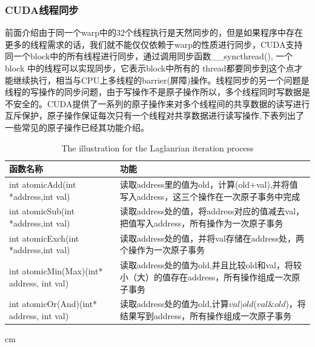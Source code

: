 \subsubsection{CUDA线程同步}
前面介绍由于同一个warp中的32个线程执行是天然同步的，但是如果程序中存在更多的线程需求的话，我们就不能仅仅依赖于warp的性质进行同步，CUDA支持同一个block中的所有线程进行同步，通过调用同步函数\_\_syncthread(), 一个block 中的线程可以实现同步，它表示block中所有的 thread都要同步到这个点才能继续执行，相当与CPU上多线程的barrier(屏障)操作。线程同步的另一个问题是线程的写操作的同步问题，由于写操作不是原子操作所以，多个线程同时写数据是不安全的。CUDA提供了一系列的原子操作来对多个线程间的共享数据的读写进行互斥保护，原子操作保证每次只有一个线程对共享数据进行读写操作,下表列出了一些常见的原子操作已经其功能介绍。
\begin{table}[t]
\newcommand{\tabincell}[2]{\begin{tabular}{@{}#1@{}}#2\end{tabular}}
\setlength{\abovecaptionskip}{0.2cm}
\scriptsize{
\renewcommand{\tabcolsep}{0.09cm}
\renewcommand{\arraystretch}{0.8}
\centering
\begin{tabular}{|p{6cm}<{\centering}|p{6cm}<{\centering}|}
\hline 函数名称& 功能\\ \hline
int atomicAdd(int *address,int val)&读取address里的值为old，计算(old+val),并将值写入address，这三个操作在一次原子事务中完成\\ \hline
int atomicSub(int *address,int val)&读取address处的值，将address对应的值减去val，把值写入address，所有操作为一次原子事务\\ \hline
int atomicExch(int *address,int val)&读取address处的值，并将val存储在address处，两个操作为一次原子事务\\ \hline
int atomicMin(Max)(int* address, int val)&读取address处的值为old,并且比较old和val，将较小（大）的值存在address，所有操作组成一次原子事务\\ \hline
int atomicOr(And)(int* address, int val)&读取address处的值为old,计算$val|old$($val \& old$)，将结果写到address，所有操作组成一次原子事务\\ \hline
\end{tabular}
  cm
  \caption{The illustration for the Laglanrian iteration process}
  \label{Iterprocess}
}
\end{table}
